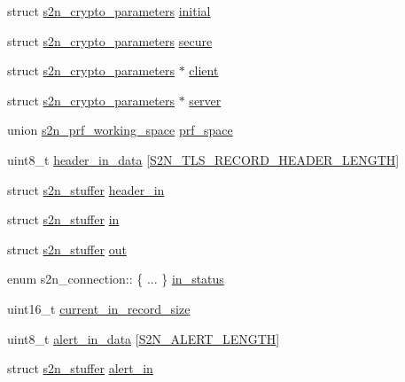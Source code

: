 \begin{DoxyCompactItemize}
\item 
struct \hyperlink{structs2n__crypto__parameters}{s2n\+\_\+crypto\+\_\+parameters} \hyperlink{structs2n__connection_afd0633da7a12696e4a8fdbf802701a05}{initial}
\item 
struct \hyperlink{structs2n__crypto__parameters}{s2n\+\_\+crypto\+\_\+parameters} \hyperlink{structs2n__connection_aaa284f060d5075d1526931181d9e4fa7}{secure}
\item 
struct \hyperlink{structs2n__crypto__parameters}{s2n\+\_\+crypto\+\_\+parameters} $\ast$ \hyperlink{structs2n__connection_a052f81d7dc7e2612341fe0da1e749ebd}{client}
\item 
struct \hyperlink{structs2n__crypto__parameters}{s2n\+\_\+crypto\+\_\+parameters} $\ast$ \hyperlink{structs2n__connection_abfab1f3796089e3576e73286c0b6889c}{server}
\item 
union \hyperlink{unions2n__prf__working__space}{s2n\+\_\+prf\+\_\+working\+\_\+space} \hyperlink{structs2n__connection_a6e6bdc3e7f6925490c4ed56405acdc10}{prf\+\_\+space}
\item 
uint8\+\_\+t \hyperlink{structs2n__connection_a98a290bc914c8d1551b72c3eac121b65}{header\+\_\+in\+\_\+data} \mbox{[}\hyperlink{s2n__tls__parameters_8h_a7cc7782f30cb9ee302929d979826c557}{S2\+N\+\_\+\+T\+L\+S\+\_\+\+R\+E\+C\+O\+R\+D\+\_\+\+H\+E\+A\+D\+E\+R\+\_\+\+L\+E\+N\+G\+TH}\mbox{]}
\item 
struct \hyperlink{structs2n__stuffer}{s2n\+\_\+stuffer} \hyperlink{structs2n__connection_a005c1df7387f2c53061e9c9432f70aca}{header\+\_\+in}
\item 
struct \hyperlink{structs2n__stuffer}{s2n\+\_\+stuffer} \hyperlink{structs2n__connection_a556c2665a42d6fd91dd28fc73d50d21e}{in}
\item 
struct \hyperlink{structs2n__stuffer}{s2n\+\_\+stuffer} \hyperlink{structs2n__connection_aa4edd9e7ae7d0068c43a8c3d54073da0}{out}
\item 
enum s2n\+\_\+connection\+:: \{ ... \}  \hyperlink{structs2n__connection_ad63a0cc0cc12429207575e5d093f59d2}{in\+\_\+status}
\item 
uint16\+\_\+t \hyperlink{structs2n__connection_a9660c08a72961b73e1ec79a862591ee7}{current\+\_\+in\+\_\+record\+\_\+size}
\item 
uint8\+\_\+t \hyperlink{structs2n__connection_aac009a408307ec7913db2b2b159465fd}{alert\+\_\+in\+\_\+data} \mbox{[}\hyperlink{s2n__tls__parameters_8h_acf0815e20ae2239c2542f1a429c3dda1}{S2\+N\+\_\+\+A\+L\+E\+R\+T\+\_\+\+L\+E\+N\+G\+TH}\mbox{]}
\item 
struct \hyperlink{structs2n__stuffer}{s2n\+\_\+stuffer} \hyperlink{structs2n__connection_a628dd7fe79c7cfd5f7bc02da8a270752}{alert\+\_\+in}

\end{DoxyCompactItemize}
